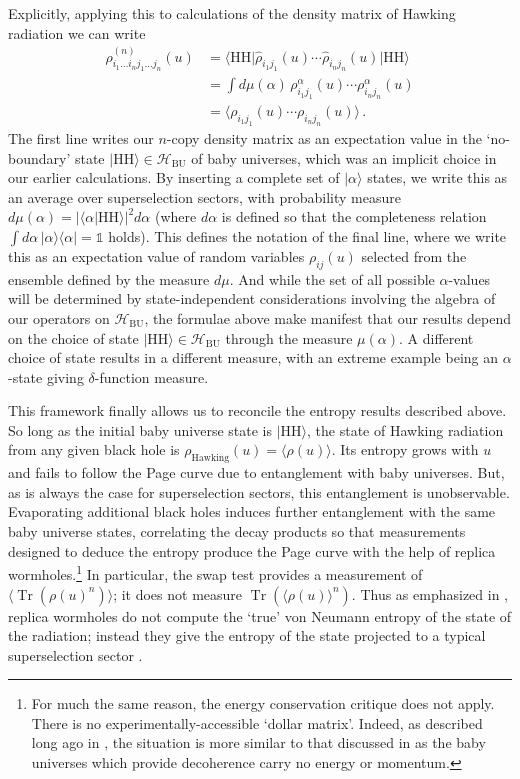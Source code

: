 \documentclass[letterpaper,12pt]{article}
\newcommand*{\hbu}{\mathcal{H}_\text{BU}} %
\DeclareMathOperator{\Tr}{Tr}
\newcommand*{\id}{\mathds{1}}
\newcommand{\HH}{\mathrm{HH}} %
\begin{document}
Explicitly, applying this to calculations of the density matrix of Hawking radiation we can write
\begin{align}
	\rho^{(n)}_{i_1\ldots i_n j_1\ldots j_n}(u) &= \big\langle \HH\big| \hat{\rho}_{i_1j_1}(u) \cdots \hat{\rho}_{i_nj_n}(u) \big|\HH\big\rangle \\
	&= \int d\mu(\alpha) \, \rho_{i_1j_1}^\alpha (u) \cdots \rho_{i_nj_n}^\alpha (u) \\
	&= \Big\langle \rho_{i_1j_1} (u) \cdots \rho_{i_nj_n} (u) \Big\rangle \,.
\end{align}
The first line writes our $n$-copy density matrix as an expectation value in the `no-boundary' state $\big|\HH\big\rangle\in\hbu$ of baby universes, which was an implicit choice in our earlier calculations. By inserting a complete set of $\big |\alpha \big \rangle$ states, we write this as an average over superselection sectors, with probability measure $d\mu(\alpha) = |\langle\alpha|\HH\rangle|^2 d\alpha$ (where $d\alpha$ is defined so that the completeness relation $\int d\alpha \, |\alpha\rangle\langle \alpha| = \id$ holds). This defines the notation of the final line, where we write this as an expectation value of random variables $\rho_{ij}(u)$ selected from the ensemble defined by the measure $d\mu$. And while the set of all possible $\alpha$-values will be determined by state-independent considerations involving the algebra of our operators on $\hbu$, the formulae above make manifest that our results depend on the choice of state $|\HH\rangle\in\hbu$ through the measure $\mu(\alpha)$.  A different choice of state results in a different measure, with an extreme example being an $\alpha$-state giving $\delta$-function measure.

This framework finally allows us to reconcile the entropy results described above. So long as the initial baby universe state is $|\HH \rangle$,  the state of Hawking radiation from any given black hole is $\rho_\mathrm{Hawking}(u) =\big\langle \rho(u) \big\rangle$. Its entropy grows with $u$ and fails to follow the Page curve due to entanglement with baby universes.  But, as is always the case for superselection sectors, this entanglement is unobservable. Evaporating additional black holes induces further entanglement with the same baby universe states, correlating the decay products so that measurements designed to deduce the entropy produce the Page curve with the help of replica wormholes.\footnote{For much the same reason, the energy conservation critique \cite{Banks:1983by} does not apply.  There is no experimentally-accessible `dollar matrix'.  Indeed, as described long ago in \cite{Coleman:1988cy,Giddings:1988cx,Giddings:1988wv},  the situation is more similar to that discussed in \cite{Unruh:2012vd} as the baby universes which provide decoherence
carry no energy or momentum.}  In particular, the swap test provides a measurement of $\big\langle \Tr(\rho(u)^n)\big\rangle$; it does not measure  $\Tr\left(\big\langle \rho(u)\big\rangle^n\right)$. Thus as emphasized in \cite{Giddings:2020yes}, replica wormholes do not compute the `true' von Neumann entropy of the state of the radiation; instead they give the entropy of the state projected to a typical superselection sector \cite{Marolf:2020xie}.
\end{document}
